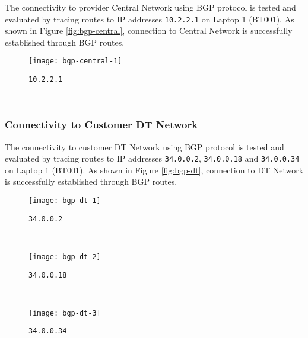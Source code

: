 The connectivity to provider Central Network using BGP protocol is tested and evaluated by tracing routes to IP addresses \texttt{10.2.2.1} on Laptop 1 (BT001). As shown in Figure \ref{fig:bgp-central}, connection to Central Network is successfully established through BGP routes.

\begin{figure*}[ht!]
    \centering
    \begin{subfigure}[b]{\textwidth}
        \centering
        \texttt{[image: bgp-central-1]}
        \caption{\texttt{10.2.2.1}}
    \end{subfigure}
    ~
    \caption{Tracing IPv4 Routes to Central Network on Laptop 1 (BT001) using \texttt{traceroute}.}
    \label{fig:bgp-central}
\end{figure*}


\clearpage


\subsubsection{Connectivity to Customer DT Network}
The connectivity to customer DT Network using BGP protocol is tested and evaluated by tracing routes to IP addresses \texttt{34.0.0.2}, \texttt{34.0.0.18} and \texttt{34.0.0.34} on Laptop 1 (BT001). As shown in Figure \ref{fig:bgp-dt}, connection to DT Network is successfully established through BGP routes.

\begin{figure*}[ht!]
    \centering
    \begin{subfigure}[b]{\textwidth}
        \centering
        \texttt{[image: bgp-dt-1]}
        \caption{\texttt{34.0.0.2}}
    \end{subfigure}
    ~
    \begin{subfigure}[b]{\textwidth}
        \centering
        \texttt{[image: bgp-dt-2]}
        \caption{\texttt{34.0.0.18}}
    \end{subfigure}
    ~
    \begin{subfigure}[b]{\textwidth}
        \centering
        \texttt{[image: bgp-dt-3]}
        \caption{\texttt{34.0.0.34}}
    \end{subfigure}
    ~
    \caption{Tracing IPv4 Routes to DT Network on Laptop 1 (BT001) using \texttt{traceroute}.}
    \label{fig:bgp-dt}
\end{figure*}




